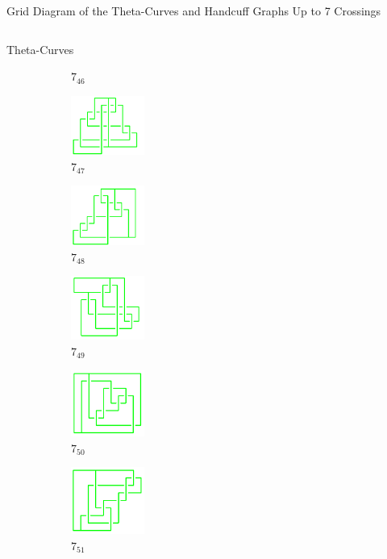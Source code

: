 \documentclass[final]{beamer}
\begin{document}
\begin{frame}[t]
\begin{alertblock}{Grid Diagram of the Theta-Curves and Handcuff Graphs Up to 7 Crossings}
\begin{columns}[t]
\begin{column}{0.6\textwidth}
\begin{alertblock}{Theta-Curves}
\begin{figure}
\begin{subfigure}{0.075\textwidth}
    \caption{$7_{46}$} 
    \end{subfigure}
    \begin{subfigure}{0.075\textwidth}
    \includegraphics[width=2.4cm]{../Midterm_Poster/grid_diagram/theta_7_47.png}
    \caption{$7_{47}$} 
    \end{subfigure}
    \begin{subfigure}{0.075\textwidth}
    \includegraphics[width=2.4cm]{../Midterm_Poster/grid_diagram/theta_7_48.png}
    \caption{$7_{48}$} 
    \end{subfigure}
    \begin{subfigure}{0.075\textwidth}
    \includegraphics[width=2.4cm]{../Midterm_Poster/grid_diagram/theta_7_49.png}
    \caption{$7_{49}$} 
    \end{subfigure}
    \begin{subfigure}{0.075\textwidth}
    \includegraphics[width=2.4cm]{../Midterm_Poster/grid_diagram/theta_7_50.png}
    \caption{$7_{50}$} 
    \end{subfigure}
    \begin{subfigure}{0.075\textwidth}
    \includegraphics[width=2.4cm]{../Midterm_Poster/grid_diagram/theta_7_51.png}
    \caption{$7_{51}$} 
    \end{subfigure}
    \begin{subfigure}{0.075\textwidth}

\end{subfigure}
\end{figure}
\end{alertblock}
\end{column}
\end{columns}
\end{alertblock}
\end{frame}
\end{document}
